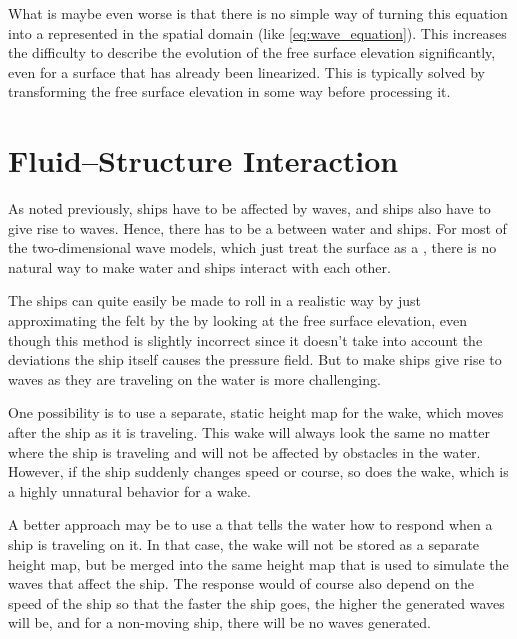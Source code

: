 What is maybe even worse is that there is no simple way of turning this equation into a \PDE represented in the spatial domain (like \eqref{eq:wave_equation}). This increases the difficulty to describe the evolution of the free surface elevation significantly, even for a surface that has already been linearized. This is typically solved by transforming the free surface elevation in some way before processing it.

\section{Fluid--Structure Interaction}

As noted previously, ships have to be affected by waves, and ships also have to give rise to waves. Hence, there has to be a  between water and ships. For most of the two-dimensional wave models, which just treat the surface as a , there is no natural way to make water and ships interact with each other.

The ships can quite easily be made to roll in a realistic way by just approximating the  felt by the  by looking at the free surface elevation, even though this method is slightly incorrect since it doesn't take into account the deviations the ship itself causes the pressure field. But to make ships give rise to waves as they are traveling on the water is more challenging.

One possibility is to use a separate, static height map for the wake, which moves after the ship as it is traveling. This wake will always look the same no matter where the ship is traveling and will not be affected by obstacles in the water. However, if the ship suddenly changes speed or course, so does the wake, which is a highly unnatural behavior for a wake.

A better approach may be to use a  that tells the water how to respond when a ship is traveling on it. In that case, the wake will not be stored as a separate height map, but be merged into the same height map that is used to simulate the waves that affect the ship. The response would of course also depend on the speed of the ship so that the faster the ship goes, the higher the generated waves will be, and for a non-moving ship, there will be no waves generated.